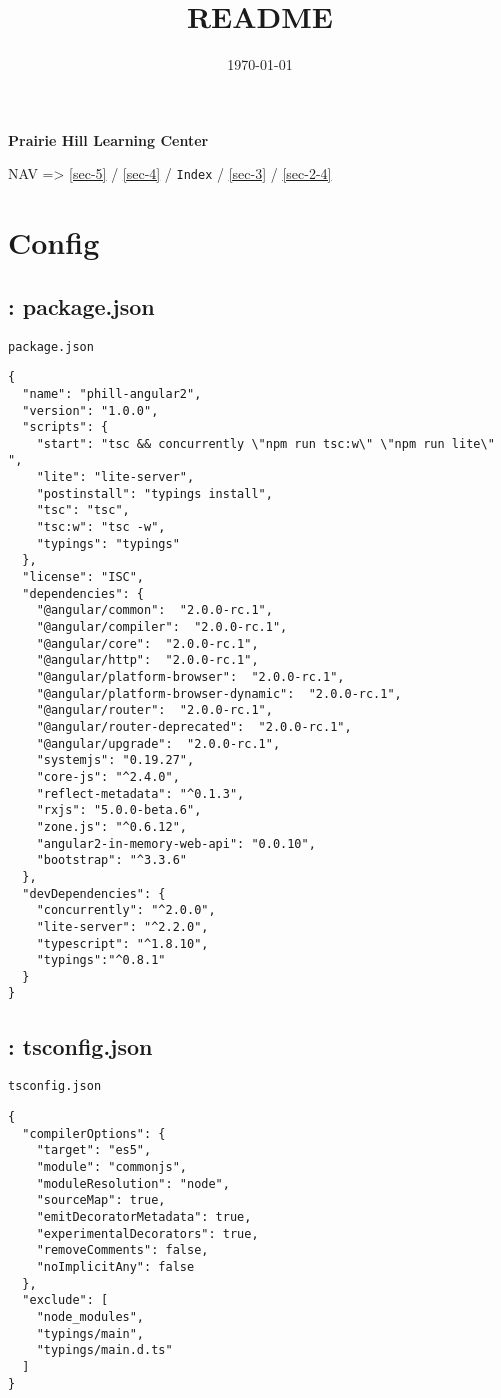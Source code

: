 \documentclass[11pt]{article}
\date{\today}
\title{README}
\begin{document}
\maketitle
\tableofcontents

\textbf{Prairie Hill Learning Center}

NAV => \ref{sec-5} / \ref{sec-4} / \texttt{Index} / \ref{sec-3} / \ref{sec-2-4}

\section{Config}
\label{sec-1}

\subsection{: package.json}
\label{sec-1-1}
\begin{verbatim}
package.json
\end{verbatim}
\begin{verbatim}
{
  "name": "phill-angular2",
  "version": "1.0.0",
  "scripts": {
    "start": "tsc && concurrently \"npm run tsc:w\" \"npm run lite\" ",
    "lite": "lite-server",
    "postinstall": "typings install",
    "tsc": "tsc",
    "tsc:w": "tsc -w",
    "typings": "typings"
  },
  "license": "ISC",
  "dependencies": {
    "@angular/common":  "2.0.0-rc.1",
    "@angular/compiler":  "2.0.0-rc.1",
    "@angular/core":  "2.0.0-rc.1",
    "@angular/http":  "2.0.0-rc.1",
    "@angular/platform-browser":  "2.0.0-rc.1",
    "@angular/platform-browser-dynamic":  "2.0.0-rc.1",
    "@angular/router":  "2.0.0-rc.1",
    "@angular/router-deprecated":  "2.0.0-rc.1",
    "@angular/upgrade":  "2.0.0-rc.1",
    "systemjs": "0.19.27",
    "core-js": "^2.4.0",
    "reflect-metadata": "^0.1.3",
    "rxjs": "5.0.0-beta.6",
    "zone.js": "^0.6.12",
    "angular2-in-memory-web-api": "0.0.10",
    "bootstrap": "^3.3.6"
  },
  "devDependencies": {
    "concurrently": "^2.0.0",
    "lite-server": "^2.2.0",
    "typescript": "^1.8.10",
    "typings":"^0.8.1"
  }
}
\end{verbatim}

\subsection{: tsconfig.json}
\label{sec-1-2}
\begin{verbatim}
tsconfig.json
\end{verbatim}
\begin{verbatim}
{
  "compilerOptions": {
    "target": "es5",
    "module": "commonjs",
    "moduleResolution": "node",
    "sourceMap": true,
    "emitDecoratorMetadata": true,
    "experimentalDecorators": true,
    "removeComments": false,
    "noImplicitAny": false
  },
  "exclude": [
    "node_modules",
    "typings/main",
    "typings/main.d.ts"
  ]
}
\end{verbatim}
\end{document}
